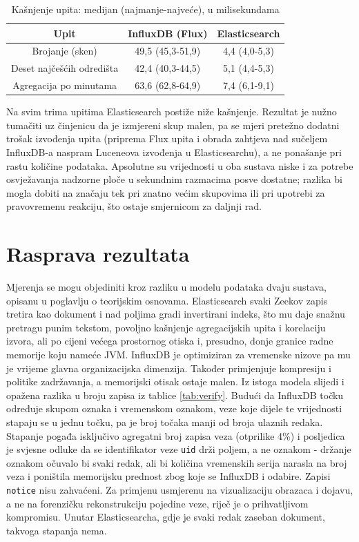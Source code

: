 \begin{table}[h]
    \centering
    \begin{tabular}{|c|c|c|}
        \hline
        \textbf{Upit} & \textbf{InfluxDB (Flux)} & \textbf{Elasticsearch} \\
        \hline
        Brojanje (sken) & 49,5 (45,3-51,9) & 4,4 (4,0-5,3) \\
        Deset najčešćih odredišta & 42,4 (40,3-44,5) & 5,1 (4,4-5,3) \\
        Agregacija po minutama & 63,6 (62,8-64,9) & 7,4 (6,1-9,1) \\
        \hline
    \end{tabular}
    \caption{Kašnjenje upita: medijan (najmanje-najveće), u milisekundama}
    \label{tab:latency}
\end{table}

Na svim trima upitima Elasticsearch postiže niže kašnjenje. Rezultat je nužno tumačiti uz činjenicu da je izmjereni skup malen, pa se mjeri pretežno dodatni trošak
izvođenja upita (priprema Flux upita i obrada zahtjeva nad sučeljem InfluxDB-a naspram Luceneova izvođenja u Elasticsearchu), a ne ponašanje pri rastu količine
podataka. Apsolutne su vrijednosti u oba sustava niske i za potrebe osvježavanja nadzorne ploče u sekundnim razmacima posve dostatne; razlika bi mogla dobiti na
značaju tek pri znatno većim skupovima ili pri upotrebi za pravovremenu reakciju, što ostaje smjernicom za daljnji rad.

\section{Rasprava rezultata}

Mjerenja se mogu objediniti kroz razliku u modelu podataka dvaju sustava, opisanu u poglavlju o teorijskim osnovama. Elasticsearch svaki Zeekov zapis
tretira kao dokument i nad poljima gradi invertirani indeks, što mu daje snažnu pretragu punim tekstom, povoljno kašnjenje agregacijskih upita i korelaciju
izvora, ali po cijeni većega prostornog otiska i, presudno, donje granice radne memorije koju nameće JVM. InfluxDB je optimiziran za vremenske
nizove pa mu je vrijeme glavna organizacijska dimenzija. Također primjenjuje kompresiju i politike zadržavanja, a memorijski otisak ostaje malen. Iz istoga modela slijedi 
i opažena razlika u broju zapisa iz tablice \ref{tab:verify}. Budući da InfluxDB točku određuje skupom oznaka i vremenskom oznakom, veze koje dijele te vrijednosti
stapaju se u jednu točku, pa je broj točaka manji od broja ulaznih redaka. Stapanje pogađa isključivo agregatni broj zapisa veza (otprilike 4\%) i posljedica je svjesne odluke da se 
identifikator veze \texttt{uid} drži poljem, a ne oznakom - držanje oznakom očuvalo bi svaki redak, ali bi količina vremenskih serija narasla na broj veza i poništila memorijsku prednost 
zbog koje se InfluxDB i odabire. Zapisi \texttt{notice} nisu zahvaćeni. Za primjenu usmjerenu na vizualizaciju obrazaca i dojavu, a ne na forenzičku rekonstrukciju pojedine veze, riječ je o 
prihvatljivom kompromisu. Unutar Elasticsearcha, gdje je svaki redak zaseban dokument, takvoga stapanja nema.


